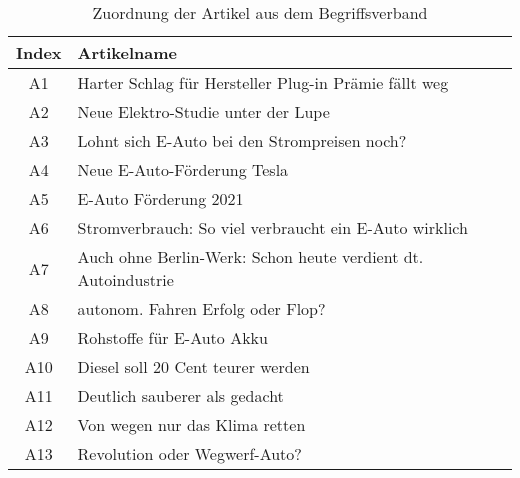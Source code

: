 \begin{table}[ht!]
    \centering
    \begin{tabular}{|c|l|}
        \hline
        \textbf{Index} & \textbf{Artikelname}                                          \\
        \hline
        A1             & Harter Schlag für Hersteller Plug-in Prämie fällt weg         \\
        A2             & Neue Elektro-Studie unter der Lupe                            \\
        A3             & Lohnt sich E-Auto bei den Strompreisen noch?                  \\
        A4             & Neue E-Auto-Förderung Tesla                                   \\
        A5             & E-Auto Förderung 2021                                         \\
        A6             & Stromverbrauch: So viel verbraucht ein E-Auto wirklich        \\
        A7             & Auch ohne Berlin-Werk: Schon heute verdient dt. Autoindustrie \\
        A8             & autonom. Fahren Erfolg oder Flop?                             \\
        A9             & Rohstoffe für E-Auto Akku                                     \\
        A10            & Diesel soll 20 Cent teurer werden                             \\
        A11            & Deutlich sauberer als gedacht                                 \\
        A12            & Von wegen nur das Klima retten                                \\
        A13            & Revolution oder Wegwerf-Auto?                                 \\
        \hline
    \end{tabular}
    \caption{\label{table:fca-match}Zuordnung der Artikel aus dem Begriffsverband}
\end{table}
